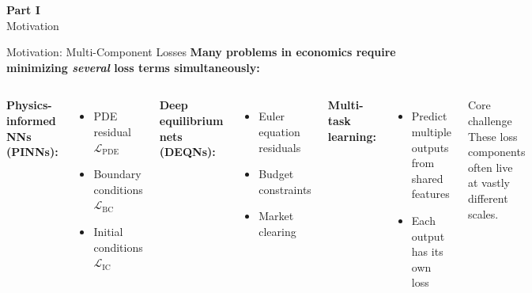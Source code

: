 \documentclass[aspectratio=169,11pt]{beamer}
\newcommand{\emphc}[1]{\textcolor{harvardcrimson}{#1}}
\begin{document}

\begin{frame}[plain,c]
\begin{center}
{\Huge \textcolor{uzhblue}{\textbf{Part I}}}\\[12pt]
{\LARGE Motivation}
\end{center}
\end{frame}

\begin{frame}{Motivation: Multi-Component Losses}
\textbf{Many problems in economics require minimizing \emph{several} loss terms simultaneously:}

\vspace{0.3cm}
\begin{columns}[T]
\textbf{Physics-informed NNs (PINNs):}
\begin{itemize}
    \item PDE residual $\mathcal{L}_\text{PDE}$
    \item Boundary conditions $\mathcal{L}_\text{BC}$
    \item Initial conditions $\mathcal{L}_\text{IC}$
\end{itemize}

\vspace{0.3cm}
\textbf{Deep equilibrium nets (DEQNs):}
\begin{itemize}
    \item Euler equation residuals
    \item Budget constraints
    \item Market clearing
\end{itemize}

\textbf{Multi-task learning:}
\begin{itemize}
    \item Predict multiple outputs from shared features
    \item Each output has its own loss
\end{itemize}

\vspace{0.3cm}
\begin{alertblock}{Core challenge}
These loss components often live at \emphc{vastly different scales}.
\end{alertblock}
\end{columns}
\end{frame}
\end{document}
